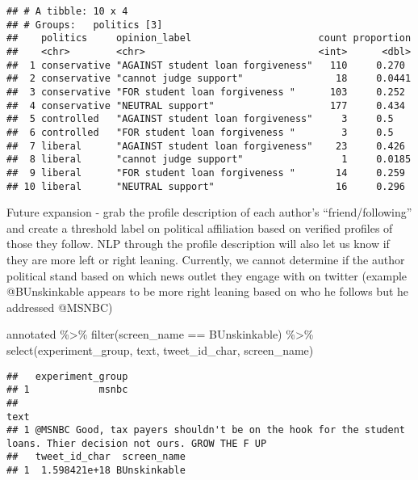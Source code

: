 \documentclass[
]{article}
\newenvironment{Shaded}{\begin{snugshade}}{\end{snugshade}}
\newcommand{\FunctionTok}[1]{\textcolor[rgb]{0.00,0.00,0.00}{#1}}
\newcommand{\NormalTok}[1]{#1}
\newcommand{\SpecialCharTok}[1]{\textcolor[rgb]{0.00,0.00,0.00}{#1}}
\newcommand{\StringTok}[1]{\textcolor[rgb]{0.31,0.60,0.02}{#1}}
\begin{document}
\begin{verbatim}
## # A tibble: 10 x 4
## # Groups:   politics [3]
##    politics     opinion_label                      count proportion
##    <chr>        <chr>                              <int>      <dbl>
##  1 conservative "AGAINST student loan forgiveness"   110     0.270 
##  2 conservative "cannot judge support"                18     0.0441
##  3 conservative "FOR student loan forgiveness "      103     0.252 
##  4 conservative "NEUTRAL support"                    177     0.434 
##  5 controlled   "AGAINST student loan forgiveness"     3     0.5   
##  6 controlled   "FOR student loan forgiveness "        3     0.5   
##  7 liberal      "AGAINST student loan forgiveness"    23     0.426 
##  8 liberal      "cannot judge support"                 1     0.0185
##  9 liberal      "FOR student loan forgiveness "       14     0.259 
## 10 liberal      "NEUTRAL support"                     16     0.296
\end{verbatim}

Future expansion - grab the profile description of each author's
``friend/following'' and create a threshold label on political
affiliation based on verified profiles of those they follow. NLP through
the profile description will also let us know if they are more left or
right leaning. Currently, we cannot determine if the author political
stand based on which news outlet they engage with on twitter (example
@BUnskinkable appears to be more right leaning based on who he follows
but he addressed @MSNBC)

\begin{Shaded}
\begin{Highlighting}[]
\NormalTok{annotated }\SpecialCharTok{\%\textgreater{}\%} \FunctionTok{filter}\NormalTok{(screen\_name }\SpecialCharTok{==} \StringTok{\textquotesingle{}BUnskinkable\textquotesingle{}}\NormalTok{) }\SpecialCharTok{\%\textgreater{}\%} \FunctionTok{select}\NormalTok{(experiment\_group, text, tweet\_id\_char, screen\_name)}
\end{Highlighting}
\end{Shaded}

\begin{verbatim}
##   experiment_group
## 1            msnbc
##                                                                                                             text
## 1 @MSNBC Good, tax payers shouldn't be on the hook for the student loans. Thier decision not ours. GROW THE F UP
##   tweet_id_char  screen_name
## 1  1.598421e+18 BUnskinkable
\end{verbatim}
\end{document}
